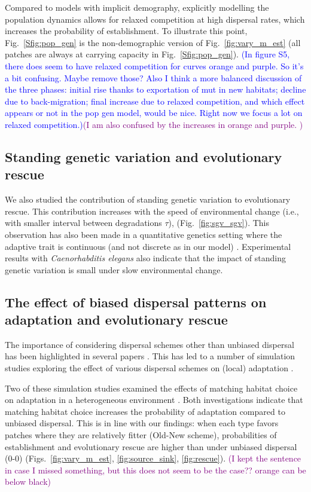 \documentclass[11pt]{article}
\newcommand{\florence}[1]{\textcolor{purple}{(#1)}} %
\newcommand{\francois}[1]{\textcolor{blue}{(#1)}}
\begin{document}
Compared to models with implicit demography, explicitly modelling the population dynamics allows for relaxed competition at high dispersal rates, which increases the probability of establishment. To illustrate this point, Fig.~\ref{Sfig:pop_gen} is the non-demographic version of Fig.~\ref{fig:vary_m_est} (all patches are always at carrying capacity in Fig.~\ref{Sfig:pop_gen}). 
\francois{In figure S5, there does seem to have relaxed competition for curves orange and purple. So it's a bit confusing. Maybe remove those? Also I think a more balanced discussion of the three phases: initial rise thanks to exportation of mut in new habitats; decline due to back-migration; final increase due to relaxed competition, and which effect appears or not in the pop gen model, would be nice. Right now we focus a lot on relaxed competition.}\florence{I am also confused by the increases in orange and purple.  }


\subsection*{Standing genetic variation and evolutionary rescue}

We also studied the contribution of standing genetic variation to evolutionary rescue. This contribution increases with the speed of environmental change (i.e., with smaller interval between degradations $\tau$), (Fig.~\ref{fig:sgv_sgv}). 
This observation has also been made in a quantitative genetics setting where the adaptive trait is continuous (and not discrete as in our model) \citep{matuszewski_2015}. Experimental results with \textit{Caenorhabditis elegans} also indicate that the impact of standing genetic variation is small under slow environmental change\citep{guzella_2018}. 

\subsection*{The effect of biased dispersal patterns on adaptation and evolutionary rescue}
The importance of considering dispersal schemes other than unbiased dispersal has been highlighted in several papers \citep{edelaar_2008,clobert_2009,edelaar_2012}. This has led to a number of simulation studies exploring the effect of various dispersal schemes on (local) adaptation %
\citep[e.g.][]{vuilleumier_2010,holt_2015,mortier_2018,pellerin_2018}. 

Two of these simulation studies examined the effects of matching habitat choice on adaptation in a heterogeneous environment \citep{vuilleumier_2010,holt_2015}. Both investigations indicate that matching habitat choice increases the probability of adaptation compared to unbiased dispersal. 
This is in line with our findings: when each type favors patches where they are relatively fitter (Old-New scheme), probabilities of establishment and evolutionary rescue are higher than under unbiased dispersal (0-0) (Figs.~\ref{fig:vary_m_est}, \ref{fig:source_sink}, \ref{fig:rescue}). \florence{I kept the sentence in case I missed something, but this does not seem to be the case?? orange can be below black}
\end{document}
